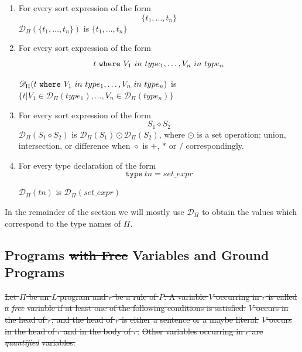 \documentclass[a4paper,10pt]{article}
\providecommand{\DIFdeltex}[1]{{\protect\color{red}\sout{#1}}}                      %
\providecommand{\DIFdelbegin}{} %
\providecommand{\DIFdelend}{} %
\providecommand{\DIFdel}[1]{\texorpdfstring{\DIFdeltex{#1}}{}} %
\begin{document}
\begin{enumerate}
\item For every sort expression of the form $$\{t_1,\ldots,t_n\}$$   $\mathcal{D}_\Pi(\{t_1,\ldots,t_n\})$ is $ \{t_1,\ldots,t_n\}$
\item For every sort expression of the form   $$t~\mbox{\texttt{where}} ~V_1~in~type_1,\ldots, V_n~in~type_n$$

\noindent
$\mathcal{D}_\Pi(t~\mbox{\texttt{where}} ~V_1~in~type_1,\ldots, V_n~in~type_n)$ is $\{t| V_1 \in \mathcal{D}_\Pi(type_1),\ldots, V_n \in \mathcal{D}_\Pi(type_n)\}$ 
\item For every sort expression of the form $$S_1 \diamond S_2$$ 
$\mathcal{D}_\Pi(S_1 \diamond S_2)$ is $ \mathcal{D}_\Pi(S_1) \odot  \mathcal{D}_\Pi(S_2)$, where $\odot$ is a set operation: union, intersection, or difference when $\diamond$ is $+$, $*$ or $/$ correspondingly.

\item For every type declaration of the form $$\texttt{type}~tn = set\_expr$$

$\mathcal{D}_\Pi(tn)$ is $\mathcal{D}_\Pi(set\_expr)$  


\end{enumerate}

\medskip\noindent
In the remainder of the section  we will mostly  use   $\mathcal{D}_\Pi$ to obtain the values  which correspond to the type names of $\Pi$.



\subsection{Programs  \DIFdelbegin \DIFdel{with Free }\DIFdelend Variables and Ground Programs}\label{grp}

\DIFdelbegin \DIFdel{Let $\Pi$ be an $L$ program and $r$ be a rule of $P$. 
A variable $V$ occurring in  $r$  is called a }\textit{\DIFdel{free}} %
\DIFdel{variable if at least one of the following conditions is satisfied:
}%
\DIFdel{$V$ occurs in the  head of $r$, and the head of $r$ is either a sentence or a maybe literal.
}%
\DIFdel{$V$ occurs in the head of $r$ and in the body of $r$.
}%
\DIFdel{Other variables occurring in $r$ are }\textit{\DIFdel{quantified}} %
\DIFdel{variables.
}%
\end{document}
